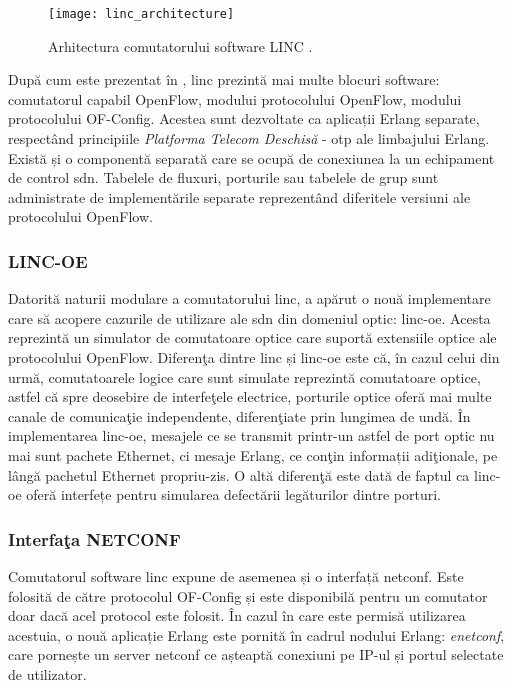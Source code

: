 \begin{figure}[h]
	\centering
	\texttt{[image: linc\_architecture]}
	\caption{Arhitectura comutatorului software LINC \cite{linc2014qsg}.}
	\label{fig:linc_architecture}
\end{figure}

După cum este prezentat în \cite{linc2014qsg}, \gls{linc} prezintă mai multe blocuri software: comutatorul capabil OpenFlow, modului protocolului OpenFlow, modului protocolului OF-Config. Acestea sunt dezvoltate ca aplicații Erlang separate, respectând principiile \textit{Platforma Telecom Deschisă} - \gls{otp} ale limbajului Erlang. Există și o componentă separată care se ocupă de conexiunea la un echipament de control \gls{sdn}. Tabelele de fluxuri, porturile sau tabelele de grup sunt administrate de implementările separate reprezentând diferitele versiuni ale protocolului OpenFlow.

\subsubsection{LINC-OE}

Datorită naturii modulare a comutatorului \gls{linc}, a apărut o nouă implementare care să acopere cazurile de utilizare ale \gls{sdn} din domeniul optic: \gls{linc-oe}. Acesta reprezintă un simulator de comutatoare optice care suportă extensiile optice ale protocolului OpenFlow. Diferenţa dintre \gls{linc} și \gls{linc-oe} este că, în cazul celui din urmă, comutatoarele logice care sunt simulate reprezintă comutatoare optice, astfel că spre deosebire de interfeţele electrice, porturile optice oferă mai multe canale de comunicaţie independente, diferenţiate prin lungimea de undă. În implementarea \gls{linc-oe}, mesajele ce se transmit printr-un astfel de port optic nu mai sunt pachete Ethernet, ci mesaje Erlang, ce conţin informații adiţionale, pe lângă pachetul Ethernet propriu-zis. O altă diferenţă este dată de faptul ca \gls{linc-oe} oferă interfețe pentru simularea defectării legăturilor dintre porturi.

\subsubsection{Interfaţa NETCONF}

Comutatorul software \gls{linc} expune de asemenea și o interfață \gls{netconf}. Este folosită de către protocolul OF-Config și este disponibilă pentru un comutator doar dacă acel protocol este folosit. În cazul în care este permisă utilizarea acestuia, o nouă aplicație Erlang este pornită în cadrul nodului Erlang: \textit{enetconf}, care pornește un server \gls{netconf} ce așteaptă conexiuni pe IP-ul și portul selectate de utilizator.

